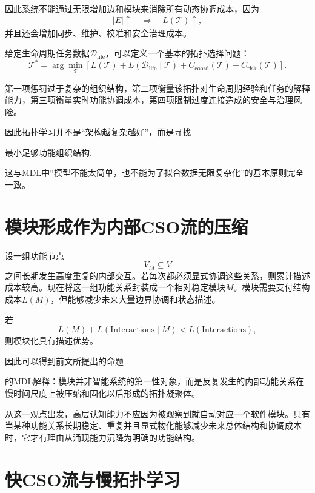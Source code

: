 因此系统不能通过无限增加边和模块来消除所有动态协调成本，因为
\[
|E|\uparrow
\quad\Longrightarrow\quad
L(\mathcal{T})\uparrow,
\]
并且还会增加同步、维护、校准和安全治理成本。

给定生命周期任务数据$\mathcal{D}_{\mathrm{life}}$，可以定义一个基本的拓扑选择问题：
\[
\boxed{
\mathcal{T}^*
=
\arg\min_{\mathcal{T}}
\left[
L(\mathcal{T})
+
L(\mathcal{D}_{\mathrm{life}}\mid\mathcal{T})
+
C_{\mathrm{coord}}(\mathcal{T})
+
C_{\mathrm{risk}}(\mathcal{T})
\right].
}
\]

第一项惩罚过于复杂的组织结构，第二项衡量该拓扑对生命周期经验和任务的解释能力，第三项衡量实时功能协调成本，第四项限制过度连接造成的安全与治理风险。

因此拓扑学习并不是“架构越复杂越好”，而是寻找
\begin{statementbox}
最小足够功能组织结构.
\end{statementbox}

这与MDL中“模型不能太简单，也不能为了拟合数据无限复杂化”的基本原则完全一致。

\section{模块形成作为内部CSO流的压缩}

设一组功能节点
\[
V_M\subseteq V
\]
之间长期发生高度重复的内部交互。若每次都必须显式协调这些关系，则累计描述成本较高。现在将这一组功能关系封装成一个相对稳定模块$M$。模块需要支付结构成本$L(M)$，但能够减少未来大量边界协调和状态描述。

若
\[
\boxed{
L(M)
+
L(\mathrm{Interactions}\mid M)
<
L(\mathrm{Interactions}),
}
\]
则模块化具有描述优势。

因此可以得到前文所提出的命题
\begin{statementbox}
\centering
{}
\end{statementbox}
的MDL解释：模块并非智能系统的第一性对象，而是反复发生的内部功能关系在慢时间尺度上被压缩和固化以后形成的拓扑凝聚体。

从这一观点出发，高层认知能力不应因为被观察到就自动对应一个软件模块。只有当某种功能关系长期稳定、重复并且显式物化能够减少未来总体结构和协调成本时，它才有理由从涌现能力沉降为明确的功能结构。

\section{快CSO流与慢拓扑学习}

